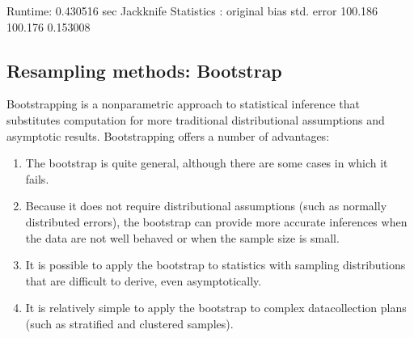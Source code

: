 \documentclass[letterpaper,10pt,english]{sphinxmanual}
\begin{document}
\begin{sphinxVerbatim}[commandchars=\\\{\}]
     


 
     


    
  
    
   
\end{sphinxVerbatim}

\begin{sphinxVerbatim}[commandchars=\\\{\}]
Runtime: 0.430516 sec
Jackknife Statistics :
original           bias      std. error
 100.186        100.176        0.153008
\end{sphinxVerbatim}


\subsection{Resampling methods: Bootstrap}
\label{\detokenize{chapter4:resampling-methods-bootstrap}}
Bootstrapping is a nonparametric approach to statistical inference
that substitutes computation for more traditional distributional
assumptions and asymptotic results. Bootstrapping offers a number of
advantages:
\begin{enumerate}
%
\item {} 
The bootstrap is quite general, although there are some cases in which it fails.

\item {} 
Because it does not require distributional assumptions (such as normally distributed errors), the bootstrap can provide more accurate inferences when the data are not well behaved or when the sample size is small.

\item {} 
It is possible to apply the bootstrap to statistics with sampling distributions that are difficult to derive, even asymptotically.

\item {} 
It is relatively simple to apply the bootstrap to complex data\sphinxhyphen{}collection plans (such as stratified and clustered samples).

\end{enumerate}
\end{document}
